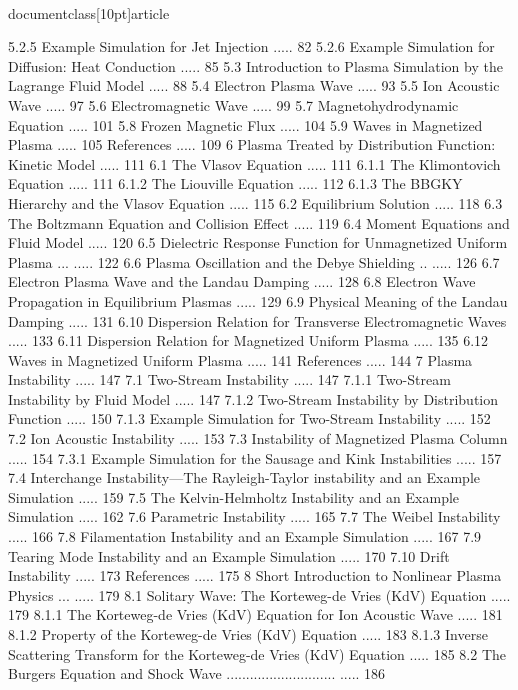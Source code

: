 \\documentclass[10pt]{article}
\begin{document}
5.2.5 Example Simulation for Jet Injection ..... 82
5.2.6 Example Simulation for Diffusion: Heat Conduction ..... 85
5.3 Introduction to Plasma Simulation by the Lagrange Fluid Model ..... 88
5.4 Electron Plasma Wave ..... 93
5.5 Ion Acoustic Wave ..... 97
5.6 Electromagnetic Wave ..... 99
5.7 Magnetohydrodynamic Equation ..... 101
5.8 Frozen Magnetic Flux ..... 104
5.9 Waves in Magnetized Plasma ..... 105
References ..... 109
6 Plasma Treated by Distribution Function: Kinetic Model ..... 111
6.1 The Vlasov Equation ..... 111
6.1.1 The Klimontovich Equation ..... 111
6.1.2 The Liouville Equation ..... 112
6.1.3 The BBGKY Hierarchy and the Vlasov Equation ..... 115
6.2 Equilibrium Solution ..... 118
6.3 The Boltzmann Equation and Collision Effect ..... 119
6.4 Moment Equations and Fluid Model ..... 120
6.5 Dielectric Response Function for Unmagnetized Uniform Plasma ... ..... 122
6.6 Plasma Oscillation and the Debye Shielding .. ..... 126
6.7 Electron Plasma Wave and the Landau Damping ..... 128
6.8 Electron Wave Propagation in Equilibrium Plasmas ..... 129
6.9 Physical Meaning of the Landau Damping ..... 131
6.10 Dispersion Relation for Transverse Electromagnetic Waves ..... 133
6.11 Dispersion Relation for Magnetized Uniform Plasma ..... 135
6.12 Waves in Magnetized Uniform Plasma ..... 141
References ..... 144
7 Plasma Instability ..... 147
7.1 Two-Stream Instability ..... 147
7.1.1 Two-Stream Instability by Fluid Model ..... 147
7.1.2 Two-Stream Instability by Distribution Function ..... 150
7.1.3 Example Simulation for Two-Stream Instability ..... 152
7.2 Ion Acoustic Instability ..... 153
7.3 Instability of Magnetized Plasma Column ..... 154
7.3.1 Example Simulation for the Sausage and Kink Instabilities ..... 157
7.4 Interchange Instability—The Rayleigh-Taylor instability and an Example Simulation ..... 159
7.5 The Kelvin-Helmholtz Instability and an Example Simulation ..... 162
7.6 Parametric Instability ..... 165
7.7 The Weibel Instability ..... 166
7.8 Filamentation Instability and an Example Simulation ..... 167
7.9 Tearing Mode Instability and an Example Simulation ..... 170
7.10 Drift Instability ..... 173
References ..... 175
8 Short Introduction to Nonlinear Plasma Physics ... ..... 179
8.1 Solitary Wave: The Korteweg-de Vries (KdV) Equation ..... 179
8.1.1 The Korteweg-de Vries (KdV) Equation for Ion Acoustic Wave ..... 181
8.1.2 Property of the Korteweg-de Vries (KdV) Equation ..... 183
8.1.3 Inverse Scattering Transform for the Korteweg-de Vries (KdV) Equation ..... 185
8.2 The Burgers Equation and Shock Wave ............................ ..... 186
\end{document}
